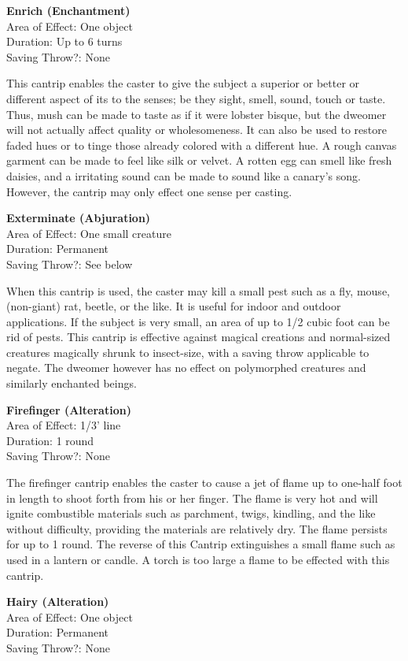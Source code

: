 \documentclass[letterpaper,sansserif,tightsqueeze]{rpg-module}
\begin{document}
\textbf{Enrich (Enchantment)}\\
Area of Effect: One object\\
Duration: Up to 6 turns\\
Saving Throw?: None

This cantrip enables the caster to give the subject a superior or better or different aspect of its to the senses; be they sight, smell, sound, touch or taste. Thus, mush can be made to taste as if it were lobster bisque, but the dweomer will not actually affect quality or wholesomeness. It can also be used to restore faded hues or to tinge those already colored with a different hue. A rough canvas garment can be made to feel like silk or velvet. A rotten egg can smell like fresh daisies, and a irritating sound can be made to sound like a canary’s song. However, the cantrip may only effect one sense per casting.
	
\textbf{Exterminate (Abjuration)}\\
Area of Effect: One small creature\\
Duration: Permanent\\
Saving Throw?: See below

When this cantrip is used, the caster may kill a small pest such as a fly, mouse, (non-giant) rat, beetle, or the like. It is useful for indoor and outdoor applications. If the subject is very small, an area of up to 1/2 cubic foot can be rid of pests. This cantrip is effective against magical creations and normal-sized creatures magically shrunk to insect-size, with a saving throw applicable to negate. The dweomer however has no effect on polymorphed creatures and similarly enchanted beings.
	
\textbf{Firefinger (Alteration)}\\
Area of Effect: 1/3' line\\
Duration: 1 round\\
Saving Throw?: None
	
The firefinger cantrip enables the caster to cause a jet of flame up to one-half foot in length to shoot forth from his or her finger. The flame is very hot and will ignite combustible materials such as parchment, twigs, kindling, and the like without difficulty, providing the materials are relatively dry. The flame persists for up to 1 round.
The reverse of this Cantrip extinguishes a small flame such as used in a lantern or candle. A torch is too large a flame to be effected with this cantrip.
	
\textbf{Hairy (Alteration)}\\
Area of Effect: One object\\
Duration: Permanent\\
Saving Throw?: None
	
\end{document}
